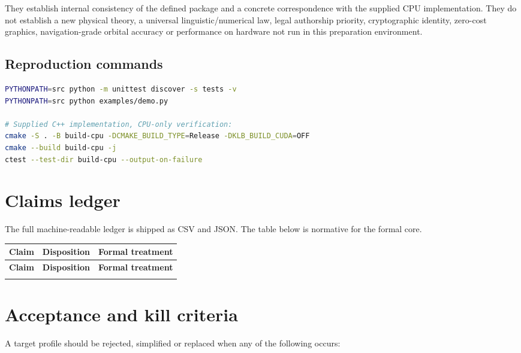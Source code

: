 \documentclass[10pt,a4paper]{article}
\begin{document}
They establish internal consistency of the defined package and a concrete correspondence with the supplied CPU implementation. They do not establish a new physical theory, a universal linguistic/numerical law, legal authorship priority, cryptographic identity, zero-cost graphics, navigation-grade orbital accuracy or performance on hardware not run in this preparation environment.

\subsection{Reproduction commands}

\begin{lstlisting}[language=bash]
PYTHONPATH=src python -m unittest discover -s tests -v
PYTHONPATH=src python examples/demo.py

# Supplied C++ implementation, CPU-only verification:
cmake -S . -B build-cpu -DCMAKE_BUILD_TYPE=Release -DKLB_BUILD_CUDA=OFF
cmake --build build-cpu -j
ctest --test-dir build-cpu --output-on-failure
\end{lstlisting}

\section{Claims ledger}
\label{sec:claims}

The full machine-readable ledger is shipped as CSV and JSON. The table below is normative for the formal core.

\small
\begin{longtable}{@{}L{52mm}L{24mm}L{85mm}@{}}
\toprule
\textbf{Claim} & \textbf{Disposition} & \textbf{Formal treatment} \\
\midrule
\endfirsthead
\toprule
\textbf{Claim} & \textbf{Disposition} & \textbf{Formal treatment} \\
\midrule
\endhead
\bottomrule
\endlastfoot

\end{longtable}
\normalsize

\section{Acceptance and kill criteria}
\label{sec:acceptance}

A target profile should be rejected, simplified or replaced when any of the following occurs:
\end{document}
